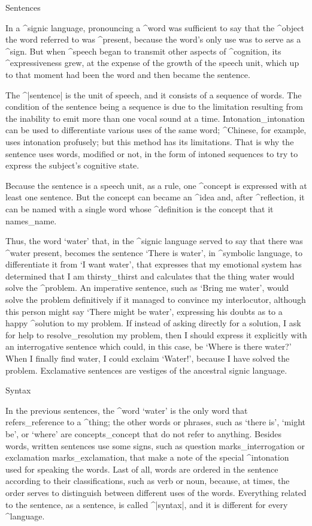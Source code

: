 \Section Sentences

In a ^{signic language}, pronouncing a ^{word} was sufficient to say
that the ^{object} the word referred to was ^{present}, because the
word's only use was to serve as a ^{sign}. But when ^{speech} began to
transmit other aspects of ^{cognition}, its ^{expressiveness} grew, at
the expense of the growth of the speech unit, which up to that moment
had been the word and then became the sentence.

The ^|sentence| is the unit of speech, and it consists of a sequence of
words. The condition of the sentence being a sequence is due to the
limitation resulting from the inability to emit more than one vocal
sound at a time. Intonation_{intonation} can be used to differentiate
various uses of the same word; ^{Chinese}, for example, uses intonation
profusely; but this method has its limitations. That is why the sentence
uses words, modified or not, in the form of intoned sequences to try to
express the subject's cognitive state.

Because the sentence is a speech unit, as a rule, one ^{concept} is
expressed with at least one sentence. But the concept can became an
^{idea} and, after ^{reflection}, it can be named with a single word
whose ^{definition} is the concept that it names_{name}.

Thus, the word `water' that, in the ^{signic language} served to say
that there was ^{water} present, becomes the sentence `There is water',
in ^{symbolic language}, to differentiate it from `I want water', that
expresses that my emotional system has determined that I am
thirsty_{thirst} and calculates that the thing water would solve the
^{problem}. An imperative sentence, such as `Bring me water', would
solve the problem definitively if it managed to convince my
interlocutor, although this person might say `There might be water',
expressing his doubts as to a happy ^{solution} to my problem. If
instead of asking directly for a solution, I ask for help to
resolve_{resolution} my problem, then I should express it explicitly
with an interrogative sentence which could, in this case, be `Where is
there water?'  When I finally find water, I could exclaim `Water!',
because I have solved the problem. Exclamative sentences are vestiges of
the ancestral signic language.


\Section Syntax

In the previous sentences, the ^{word} `water' is the only word that
refers_{reference} to a ^{thing}; the other words or phrases, such as
`there is', `might be', or `where' are concepts_{concept} that do not
refer to anything. Besides words, written sentences use some signs, such
as question marks_{interrogation} or exclamation marks_{exclamation},
that make a note of the special ^{intonation} used for speaking the
words. Last of all, words are ordered in the sentence according to their
classifications, such as verb or noun, because, at times, the order
serves to distinguish between different uses of the words. Everything
related to the sentence, as a sentence, is called ^|syntax|, and it is
different for every ^{language}.


